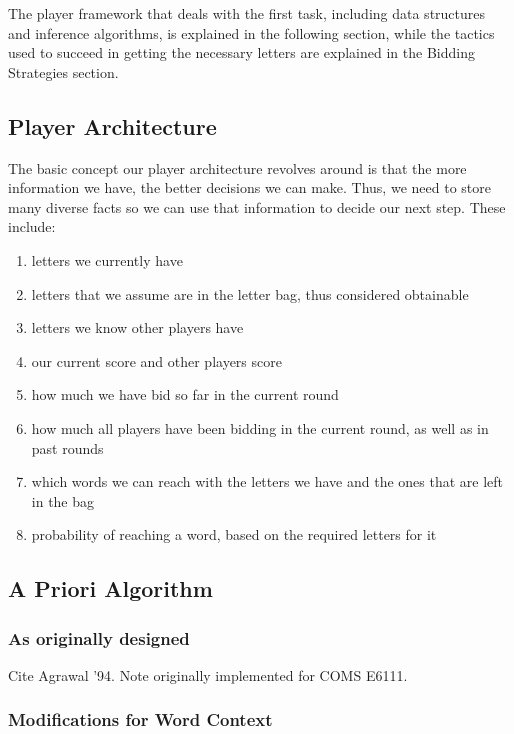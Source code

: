 \documentclass[11pt]{article}
\begin{document}
The player framework that deals with the first task, including data structures and inference algorithms, is explained in the following section, while the tactics used to succeed in getting the necessary letters are explained in the Bidding Strategies section. 

\subsection{Player Architecture}

The basic concept our player architecture revolves around is that the more information we have, the better decisions we can make. Thus, we need to store many diverse facts so we can use that information to decide our next step. These include:

\begin{enumerate}
\item letters we currently have
\item letters that we assume are in the letter bag, thus considered obtainable
\item letters we know other players have
\item our current score and other players score
\item how much we have bid so far in the current round
\item how much all players have been bidding in the current round, as well as in past rounds
\item which words we can reach with the letters we have and the ones that are left in the bag
\item probability of reaching a word, based on the required letters for it
\end{enumerate}

\subsection{A Priori Algorithm} %
\subsubsection{As originally designed}

Cite Agrawal '94.  Note originally implemented for COMS E6111.

\subsubsection{Modifications for Word Context}
\end{document}
